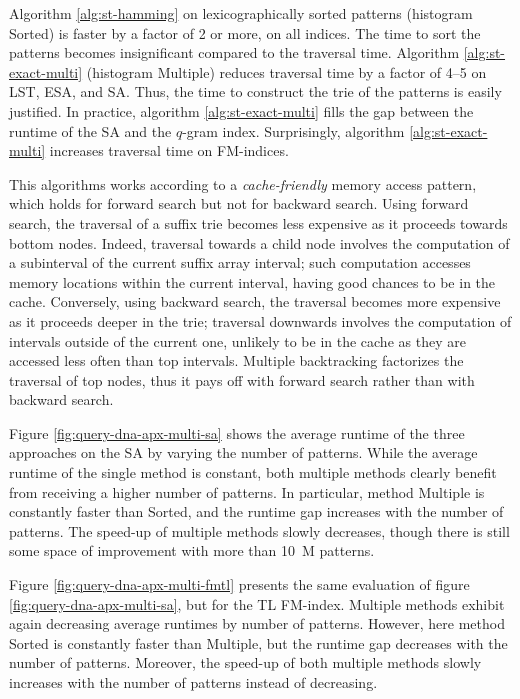 Algorithm \ref{alg:st-hamming} on lexicographically sorted patterns (histogram Sorted) is faster by a factor of 2 or more, on all indices.
The time to sort the patterns becomes insignificant compared to the traversal time.
Algorithm \ref{alg:st-exact-multi} (histogram Multiple) reduces traversal time by a factor of 4--5 on LST, ESA, and SA.
Thus, the time to construct the trie of the patterns is easily justified.
In practice, algorithm \ref{alg:st-exact-multi} fills the gap between the runtime of the SA and the $q$-gram index.
Surprisingly, algorithm \ref{alg:st-exact-multi} increases traversal time on FM-indices.

This algorithms works according to a \emph{cache-friendly} memory access pattern, which holds for forward search but not for backward search.
Using forward search, the traversal of a suffix trie becomes less expensive as it proceeds towards bottom nodes.
Indeed, traversal towards a child node involves the computation of a subinterval of the current suffix array interval; such computation accesses memory locations within the current interval, having good chances to be in the cache.
Conversely, using backward search, the traversal becomes more expensive as it proceeds deeper in the trie; traversal downwards involves the computation of intervals outside of the current one, unlikely to be in the cache as they are accessed less often than top intervals.
Multiple backtracking factorizes the traversal of top nodes, thus it pays off with forward search rather than with backward search.

Figure \ref{fig:query-dna-apx-multi-sa} shows the average runtime of the three approaches on the SA by varying the number of patterns.
While the average runtime of the single method is constant, both multiple methods clearly benefit from receiving a higher number of patterns.
In particular, method Multiple is constantly faster than Sorted, and the runtime gap increases with the number of patterns.
The speed-up of multiple methods slowly decreases, though there is still some space of improvement with more than 10~M patterns.

Figure \ref{fig:query-dna-apx-multi-fmtl} presents the same evaluation of figure \ref{fig:query-dna-apx-multi-sa}, but for the TL FM-index.
Multiple methods exhibit again decreasing average runtimes by number of patterns.
However, here method Sorted is constantly faster than Multiple, but the runtime gap decreases with the number of patterns.
Moreover, the speed-up of both multiple methods slowly increases with the number of patterns instead of decreasing.

